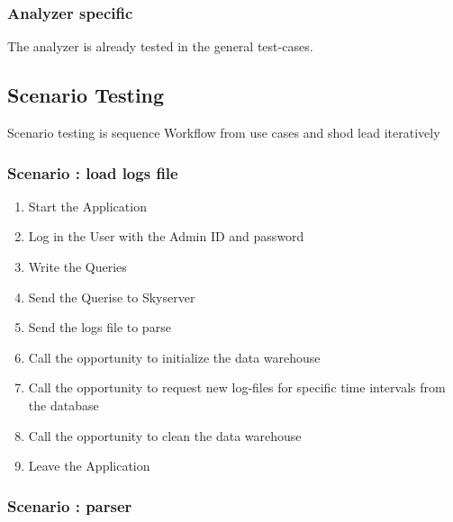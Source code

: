 \subsubsection{Analyzer specific}

The analyzer is already tested in the general test-cases.



\subsection{Scenario Testing}

Scenario testing is sequence Workflow from use cases and shod lead iteratively

\renewcommand{\theenumi}{/T\arabic{enumi}0/}
\renewcommand{\labelenumi}{\theenumi}

\subsubsection {Scenario : load logs file} 

\begin{enumerate}
 
\item Start the Application

\item Log in the User with the Admin ID and password

\item Write the Queries

\item Send the Querise to Skyserver

\item Send the logs file to parse

\item Call the opportunity to initialize the data warehouse

\item Call the opportunity to request new log-files for specific time intervals from the
database

\item Call the opportunity to clean the data warehouse %

\item Leave the Application

\end{enumerate}

\subsubsection {Scenario : parser} 


